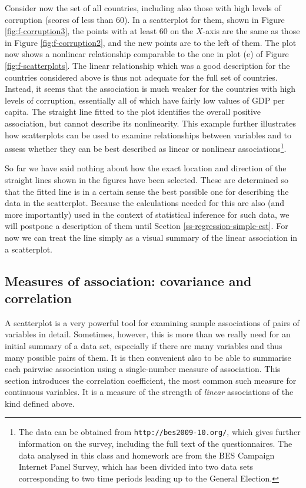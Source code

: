 \documentclass[11pt,a4paper,openany]{book}
\let\rmarkdownfootnote\footnote%
\def\footnote{\protect\rmarkdownfootnote}
\begin{document}
Consider now the set of all countries, including also those with high
levels of corruption (scores of less than 60). In a scatterplot for
them, shown in Figure \ref{fig:f-corruption3}, the points with at least
60 on the \(X\)-axis are the same as those in Figure
\ref{fig:f-corruption2}, and the new points are to the left of them. The
plot now shows a nonlinear relationship comparable to the one in plot
(e) of Figure \ref{fig:f-scatterplots}. The linear relationship which
was a good description for the countries considered above is thus not
adequate for the full set of countries. Instead, it seems that the
association is much weaker for the countries with high levels of
corruption, essentially all of which have fairly low values of GDP per
capita. The straight line fitted to the plot identifies the overall
positive association, but cannot describe its nonlinearity. This example
further illustrates how scatterplots can be used to examine
relationships between variables and to assess whether they can be best
described as linear or nonlinear associations\footnote{The data can be
  obtained from \texttt{http://bes2009-10.org/}, which gives further
  information on the survey, including the full text of the
  questionnaires. The data analysed in this class and homework are from
  the BES Campaign Internet Panel Survey, which has been divided into
  two data sets corresponding to two time periods leading up to the
  General Election.}.

So far we have said nothing about how the exact location and direction
of the straight lines shown in the figures have been selected. These are
determined so that the fitted line is in a certain sense the best
possible one for describing the data in the scatterplot. Because the
calculations needed for this are also (and more importantly) used in the
context of statistical inference for such data, we will postpone a
description of them until Section \ref{ss-regression-simple-est}. For
now we can treat the line simply as a visual summary of the linear
association in a scatterplot.

\subsection{Measures of association: covariance and
correlation}\label{ss-regression-descr-corr}

A scatterplot is a very powerful tool for examining sample associations
of pairs of variables in detail. Sometimes, however, this is more than
we really need for an initial summary of a data set, especially if there
are many variables and thus many possible pairs of them. It is then
convenient also to be able to summarise each pairwise association using
a single-number measure of association. This section introduces the
correlation coefficient, the most common such measure for continuous
variables. It is a measure of the strength of \emph{linear} associations
of the kind defined above.
\end{document}
